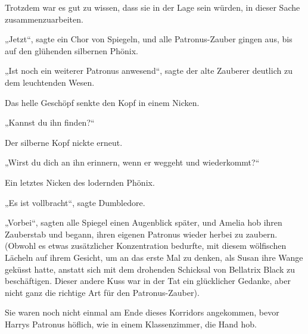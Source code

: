 Trotzdem war es gut zu wissen, dass sie in der Lage sein würden, in dieser Sache zusammenzuarbeiten.

„Jetzt“, sagte ein Chor von Spiegeln, und alle Patronus-Zauber gingen aus, bis auf den glühenden silbernen Phönix.

„Ist noch ein weiterer Patronus anwesend“, sagte der alte Zauberer deutlich zu dem leuchtenden Wesen.

Das helle Geschöpf senkte den Kopf in einem Nicken.

„Kannst du ihn finden?“

Der silberne Kopf nickte erneut.

„Wirst du dich an ihn erinnern, wenn er weggeht und wiederkommt?“

Ein letztes Nicken des lodernden Phönix.

„Es ist vollbracht“, sagte Dumbledore.

„Vorbei“, sagten alle Spiegel einen Augenblick später, und Amelia hob ihren Zauberstab und begann, ihren eigenen Patronus wieder herbei zu zaubern. (Obwohl es etwas zusätzlicher Konzentration bedurfte, mit diesem wölfischen Lächeln auf ihrem Gesicht, um an das erste Mal zu denken, als Susan ihre Wange geküsst hatte, anstatt sich mit dem drohenden Schicksal von Bellatrix Black zu beschäftigen. Dieser andere Kuss war in der Tat ein glücklicher Gedanke, aber nicht ganz die richtige Art für den Patronus-Zauber).

\later

Sie waren noch nicht einmal am Ende dieses Korridors angekommen, bevor Harrys Patronus höflich, wie in einem Klassenzimmer, die Hand hob.

